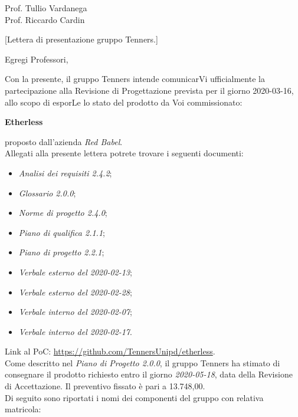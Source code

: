 \begin{letter}{\begin{flushright}
			Prof. Tullio Vardanega \\
			Prof. Riccardo Cardin 
	\end{flushright}}[Lettera di presentazione gruppo Tenners.]
\opening[Padova, ]{Egregi Professori,}
	\noindent Con la presente, il gruppo Tenners intende comunicarVi ufficialmente la partecipazione alla Revisione di Progettazione prevista per il giorno 2020-03-16, allo scopo di esporLe lo stato del prodotto da Voi commissionato:
	\begin{center}
		\textbf{Etherless}
	\end{center}
    proposto dall'azienda \textit{Red Babel}. \\
    \noindent Allegati alla presente lettera potrete trovare i seguenti documenti:
    \begin{itemize}
    	\item \textit{Analisi dei requisiti 2.4.2\docs};
    	\item \textit{Glossario 2.0.0\docs};
    	\item \textit{Norme di progetto 2.4.0\docs};
    	\item \textit{Piano di qualifica 2.1.1\docs};
    	\item \textit{Piano di progetto 2.2.1\docs};
    	\item \textit{Verbale esterno del 2020-02-13\docs};
    	\item \textit{Verbale esterno del 2020-02-28\docs};
    	\item \textit{Verbale interno del 2020-02-07\docs};
    	\item \textit{Verbale interno del 2020-02-17\docs}.
    \end{itemize}
	Link al PoC: \url{https://github.com/TennersUnipd/etherless}.\\
    \noindent Come descritto nel \textit{Piano di Progetto 2.0.0}\docs, il gruppo Tenners ha stimato di consegnare il prodotto richiesto entro il giorno \textit{2020-05-18}, data della Revisione di Accettazione. Il preventivo fissato è pari a 13.748,00\officialeuro.\\ 
    \noindent Di seguito sono riportati i nomi dei componenti del gruppo con relativa matricola:
    \begin{center}
    	\renewcommand{\arraystretch}{1.8}
    	

\end{center}
\end{letter}
